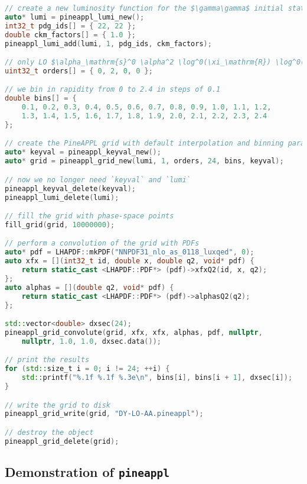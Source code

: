 \begin{lstlisting}[language=C++,mathescape=true]
// create a new luminosity function for the $\gamma\gamma$ initial state
auto* lumi = pineappl_lumi_new();
int32_t pdg_ids[] = { 22, 22 };
double ckm_factors[] = { 1.0 };
pineappl_lumi_add(lumi, 1, pdg_ids, ckm_factors);

// only LO $\alpha_\mathrm{s}^0 \alpha^2 \log^0(\xi_\mathrm{R}) \log^0(\xi_\mathrm{F})$
uint32_t orders[] = { 0, 2, 0, 0 };

// we bin in rapidity from 0 to 2.4 in steps of 0.1
double bins[] = {
    0.1, 0.2, 0.3, 0.4, 0.5, 0.6, 0.7, 0.8, 0.9, 1.0, 1.1, 1.2,
    1.3, 1.4, 1.5, 1.6, 1.7, 1.8, 1.9, 2.0, 2.1, 2.2, 2.3, 2.4
};

// create the PineAPPL grid with default interpolation and binning parameters
auto* keyval = pineappl_keyval_new();
auto* grid = pineappl_grid_new(lumi, 1, orders, 24, bins, keyval);

// now we no longer need `keyval` and `lumi`
pineappl_keyval_delete(keyval);
pineappl_lumi_delete(lumi);

// fill the grid with phase-space points
fill_grid(grid, 10000000);

// perform a convolution of the grid with PDFs
auto* pdf = LHAPDF::mkPDF("NNPDF31_nlo_as_0118_luxqed", 0);
auto xfx = [](int32_t id, double x, double q2, void* pdf) {
    return static_cast <LHAPDF::PDF*> (pdf)->xfxQ2(id, x, q2);
};
auto alphas = [](double q2, void* pdf) {
    return static_cast <LHAPDF::PDF*> (pdf)->alphasQ2(q2);
};

std::vector<double> dxsec(24);
pineappl_grid_convolute(grid, xfx, xfx, alphas, pdf, nullptr,
    nullptr, 1.0, 1.0, dxsec.data());

// print the results
for (std::size_t i = 0; i != 24; ++i) {
    std::printf("%.1f %.1f %.3e\n", bins[i], bins[i + 1], dxsec[i]);
}

// write the grid to disk
pineappl_grid_write(grid, "DY-LO-AA.pineappl");

// destroy the object
pineappl_grid_delete(grid);
\end{lstlisting}

\subsection{Demonstration of \texorpdfstring{\texttt{pineappl}}{pineappl}}
\label{app:pineappl-demo}

